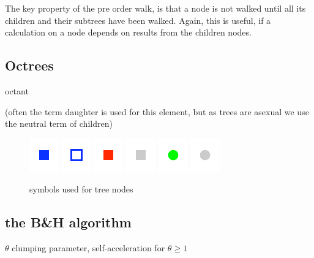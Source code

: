 The key property of the pre order walk, is that a node is not walked until all its children and their subtrees have been walked. Again, this is useful, if a calculation on a node depends on results from the children nodes.

\subsection{Octrees}
octant

(often the term daughter is used for this element, but as trees are asexual we use the neutral term of children)


\begin{figure}[htbp]
\begin{center}
\includegraphics{ttnode_filled_local.pdf}
\includegraphics{ttnode_empty_local.pdf}
\includegraphics{node_filled_local.pdf}
\includegraphics{node_filled_remote.pdf}
\hspace{1cm}
\includegraphics{particle_filled_local.pdf}
\includegraphics{particle_filled_remote.pdf}
\caption{symbols used for tree nodes}
\label{fig:nodetypes}
\end{center}
\end{figure}


\subsection{the B\&H algorithm}
$\theta$ clumping parameter, self-acceleration for $\theta \ge 1$
